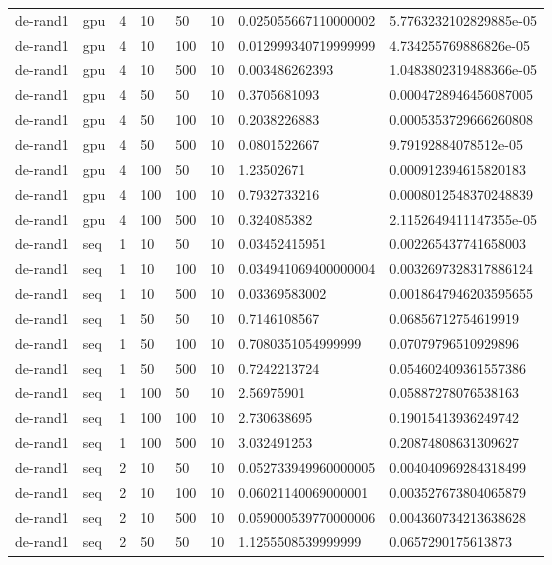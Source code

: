\begin{table}[t]
\begin{tabular}{llllllll}
de-rand1 & gpu & 4 & 10 & 50 & 10 & 0.025055667110000002 & 5.7763232102829885e-05 \\
de-rand1 & gpu & 4 & 10 & 100 & 10 & 0.012999340719999999 & 4.734255769886826e-05 \\
de-rand1 & gpu & 4 & 10 & 500 & 10 & 0.003486262393 & 1.0483802319488366e-05 \\
de-rand1 & gpu & 4 & 50 & 50 & 10 & 0.3705681093 & 0.0004728946456087005 \\
de-rand1 & gpu & 4 & 50 & 100 & 10 & 0.2038226883 & 0.0005353729666260808 \\
de-rand1 & gpu & 4 & 50 & 500 & 10 & 0.0801522667 & 9.79192884078512e-05 \\
de-rand1 & gpu & 4 & 100 & 50 & 10 & 1.23502671 & 0.000912394615820183 \\
de-rand1 & gpu & 4 & 100 & 100 & 10 & 0.7932733216 & 0.0008012548370248839 \\
de-rand1 & gpu & 4 & 100 & 500 & 10 & 0.324085382 & 2.1152649411147355e-05 \\
de-rand1 & seq & 1 & 10 & 50 & 10 & 0.03452415951 & 0.002265437741658003 \\
de-rand1 & seq & 1 & 10 & 100 & 10 & 0.034941069400000004 & 0.0032697328317886124 \\
de-rand1 & seq & 1 & 10 & 500 & 10 & 0.03369583002 & 0.0018647946203595655 \\
de-rand1 & seq & 1 & 50 & 50 & 10 & 0.7146108567 & 0.06856712754619919 \\
de-rand1 & seq & 1 & 50 & 100 & 10 & 0.7080351054999999 & 0.07079796510929896 \\
de-rand1 & seq & 1 & 50 & 500 & 10 & 0.7242213724 & 0.054602409361557386 \\
de-rand1 & seq & 1 & 100 & 50 & 10 & 2.56975901 & 0.05887278076538163 \\
de-rand1 & seq & 1 & 100 & 100 & 10 & 2.730638695 & 0.19015413936249742 \\
de-rand1 & seq & 1 & 100 & 500 & 10 & 3.032491253 & 0.20874808631309627 \\
de-rand1 & seq & 2 & 10 & 50 & 10 & 0.052733949960000005 & 0.004040969284318499 \\
de-rand1 & seq & 2 & 10 & 100 & 10 & 0.06021140069000001 & 0.003527673804065879 \\
de-rand1 & seq & 2 & 10 & 500 & 10 & 0.059000539770000006 & 0.004360734213638628 \\
de-rand1 & seq & 2 & 50 & 50 & 10 & 1.1255508539999999 & 0.0657290175613873 \\

\end{tabular}
\end{table}
